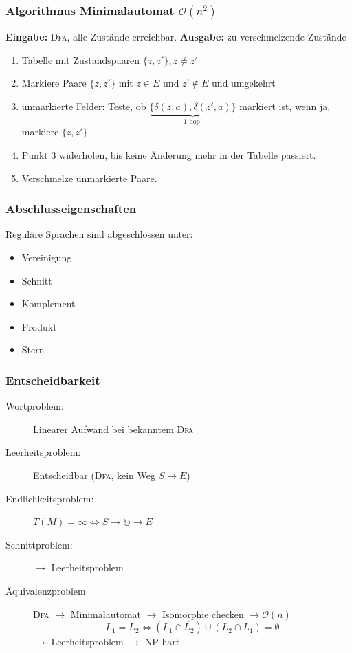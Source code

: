 \documentclass{scrartcl}
\begin{document}
\subsubsection*{Algorithmus Minimalautomat $\mathcal{O}(n^2)$}
\textbf{Eingabe:} \textsc{Dfa}, alle Zustände erreichbar.
\textbf{Ausgabe:} zu verschmelzende Zustände
\begin{enumerate}
    \item Tabelle mit Zustandspaaren $\{z,z'\}, z\not= z'$
    \item Markiere Paare $\{z,z'\}$ mit $z\in E$ und $z'\not\in E$ und umgekehrt
    \item unmarkierte Felder: Teste, ob $\underset{1\textrm{ hop!}}{\underbrace{\{\delta(z,a),\delta(z',a)\}}}$ markiert ist, wenn ja, markiere $\{z,z'\}$
    \item Punkt $3$ widerholen, bis keine Änderung mehr in der Tabelle passiert.
    \item Verschmelze unmarkierte Paare.
\end{enumerate}

\subsubsection*{Abschlusseigenschaften}
\begin{shaded}
    Reguläre Sprachen sind abgeschlossen unter:
    \begin{itemize}
        \item Vereinigung
        \item Schnitt
        \item Komplement
        \item Produkt
        \item Stern
    \end{itemize}
\end{shaded}

\subsubsection*{Entscheidbarkeit}
\begin{description}
    \item[Wortproblem:] Linearer Aufwand bei bekanntem \textsc{Dfa}
    \item[Leerheitsproblem:] Entscheidbar (\textsc{Dfa}, kein Weg $S\to E$)
    \item[Endlichkeitsproblem:] $T(M) = \infty \Leftrightarrow S\to\circlearrowright\to E$
    \item[Schnittproblem:] $\to$ Leerheitsproblem
    \item[Äquivalenzproblem] \textsc{Dfa} $\to$ Minimalautomat $\to$ Isomorphie checken $\to \mathcal{O}(n)$
    \[ L_1 = L_2 \Leftrightarrow \left(L_1 \cap \overline{L_2}\right) \cup \left(L_2 \cap L_1\right) = \emptyset \]
    $\to$ Leerheitsproblem $\to$ NP-hart
\end{description}
\end{document}
